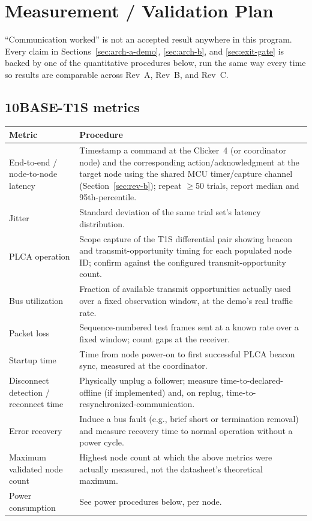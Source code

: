 \section{Measurement / Validation Plan}
\label{sec:validation-plan}

``Communication worked'' is not an accepted result anywhere in this program. Every claim in Sections~\ref{sec:arch-a-demo}, \ref{sec:arch-b}, and \ref{sec:exit-gate} is backed by one of the quantitative procedures below, run the same way every time so results are comparable across Rev~A, Rev~B, and Rev~C.

\subsection{10BASE-T1S metrics}

\begin{center}
\small
\begin{tabularx}{\linewidth}{@{}p{3.6cm} X@{}}
\toprule
\textbf{Metric} & \textbf{Procedure} \\
\midrule
End-to-end / node-to-node latency & Timestamp a command at the Clicker~4 (or coordinator node) and the corresponding action/acknowledgment at the target node using the shared MCU timer/capture channel (Section~\ref{sec:rev-b}); repeat $\geq$50 trials, report median and 95th-percentile. \\
Jitter & Standard deviation of the same trial set's latency distribution. \\
PLCA operation & Scope capture of the T1S differential pair showing beacon and transmit-opportunity timing for each populated node ID; confirm against the configured transmit-opportunity count. \\
Bus utilization & Fraction of available transmit opportunities actually used over a fixed observation window, at the demo's real traffic rate. \\
Packet loss & Sequence-numbered test frames sent at a known rate over a fixed window; count gaps at the receiver. \\
Startup time & Time from node power-on to first successful PLCA beacon sync, measured at the coordinator. \\
Disconnect detection / reconnect time & Physically unplug a follower; measure time-to-declared-offline (if implemented) and, on replug, time-to-resynchronized-communication. \\
Error recovery & Induce a bus fault (e.g., brief short or termination removal) and measure recovery time to normal operation without a power cycle. \\
Maximum validated node count & Highest node count at which the above metrics were actually measured, not the datasheet's theoretical maximum. \\
Power consumption & See power procedures below, per node. \\
\bottomrule
\end{tabularx}
\end{center}

